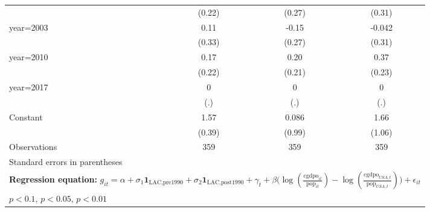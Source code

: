 \begin{sidewaystable}[htbp]
\begin{tabular}{l*{3}{c}}
                &   (0.22)         &   (0.27)         &   (0.31)         \\
\addlinespace
year=2003       &     0.11         &    -0.15         &   -0.042         \\
                &   (0.33)         &   (0.27)         &   (0.31)         \\
\addlinespace
year=2010       &     0.17         &     0.20         &     0.37         \\
                &   (0.22)         &   (0.21)         &   (0.23)         \\
\addlinespace
year=2017       &        0         &        0         &        0         \\
                &      (.)         &      (.)         &      (.)         \\
\addlinespace
Constant        &     1.57\sym{***}&    0.086         &     1.66         \\
                &   (0.39)         &   (0.99)         &   (1.06)         \\
\midrule
Observations    &      359         &      359         &      359         \\
\bottomrule
\multicolumn{4}{l}{\footnotesize Standard errors in parentheses}\\
\multicolumn{4}{l}{\footnotesize \textbf{Regression equation:} \(g_{it} = \alpha + \sigma_1 \mathbf{1}_{\textrm{LAC,pre1990}} + \sigma_2 \mathbf{1}_{\textrm{LAC,post1990}} + \gamma_t + \beta \big(\log (\frac{\textrm{cgdpo}_{it}}{\textrm{pop}_{it}} ) - \log (\frac{\textrm{cgdpo}_{USA,t}}{\textrm{pop}_{USA,t}}  ) \big) + \epsilon_{it}\)}\\
\multicolumn{4}{l}{\footnotesize \sym{*} \(p<0.1\), \sym{**} \(p<0.05\), \sym{***} \(p<0.01\)}\\
\end{tabular}
\end{sidewaystable}
